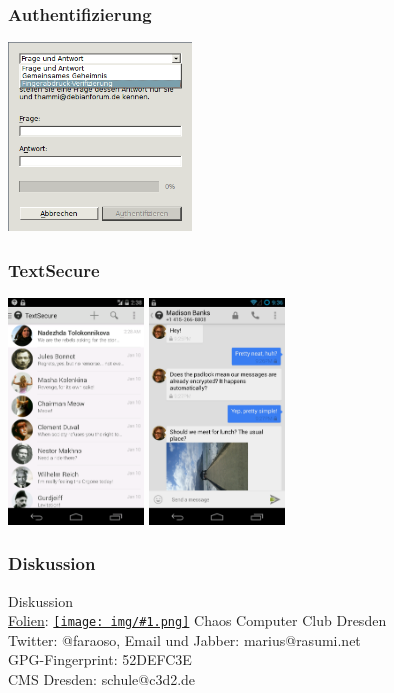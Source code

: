 \documentclass[12pt]{beamer}
\newcommand{\cc}[1]{\texttt{[image: img/\#1.png]}\hspace{1mm}}
\begin{document}
\begin{frame}
  \frametitle{Authentifizierung}
    \begin{center}
      \includegraphics[height=5cm]{img/auth.png}
    \end{center}
\end{frame}

\begin{frame}
  \frametitle{TextSecure}
    \begin{center}
      \includegraphics[height=6cm]{img/textsecure1.png}
      \hspace{0.5cm}
      \includegraphics[height=6cm]{img/textsecure2.png}
    \end{center}
\end{frame}
 
\begin{frame}
  \frametitle{Diskussion}
  \begin{center}
    {\Large Diskussion}\\
    \vspace{5mm} 
    \href{https://github.com/c3d2/cms-nsa}{Folien}: \href{https://creativecommons.org/licenses/by-sa/4.0/}{\cc{by-sa}} Chaos Computer Club Dresden \\
    \vspace{4mm}
    Twitter: @faraoso, Email und Jabber: marius@rasumi.net\\GPG-Fingerprint: 52DEFC3E\\
    \vspace{4mm}
    CMS Dresden: schule@c3d2.de
  \end{center}
\end{frame}
\end{document}

